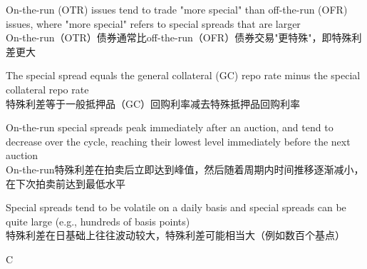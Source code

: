 \documentclass{article}
\begin{document}
\begin{choices}
    \item On-the-run (OTR) issues tend to trade "more special" than off-the-run (OFR) issues, where "more special" refers to special spreads that are larger\\
    On-the-run（OTR）债券通常比off-the-run（OFR）债券交易"更特殊"，即特殊利差更大
    \item The special spread equals the general collateral (GC) repo rate minus the special collateral repo rate\\
    特殊利差等于一般抵押品（GC）回购利率减去特殊抵押品回购利率
    \item On-the-run special spreads peak immediately after an auction, and tend to decrease over the cycle, reaching their lowest level immediately before the next auction\\
    On-the-run特殊利差在拍卖后立即达到峰值，然后随着周期内时间推移逐渐减小，在下次拍卖前达到最低水平
    \item Special spreads tend to be volatile on a daily basis and special spreads can be quite large (e.g., hundreds of basis points)\\
    特殊利差在日基础上往往波动较大，特殊利差可能相当大（例如数百个基点）
\end{choices}

\begin{correctanswer}
    C
\end{correctanswer}
\end{document}
